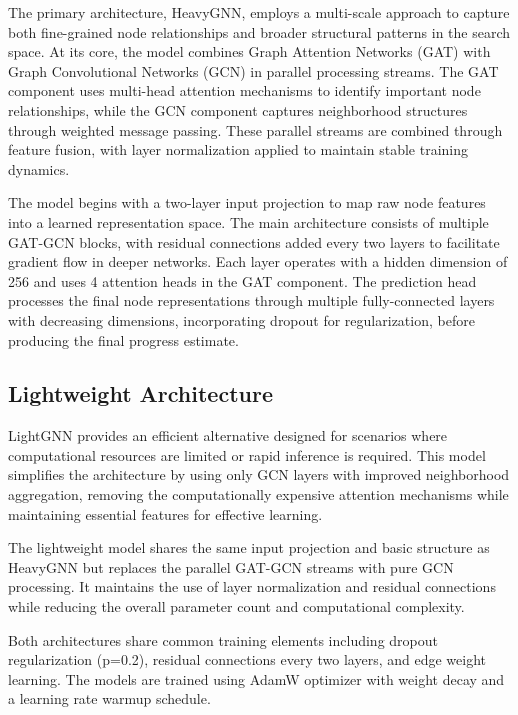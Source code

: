 \documentclass[letterpaper]{article}
\newcommand{\gur}[1]{{\color{teal}{Gur: #1}}}
\begin{document}
\gur{GAT - global structure or only neighbors weighting?}

The primary architecture, HeavyGNN, employs a multi-scale approach to capture both fine-grained node relationships and broader structural patterns in the search space. At its core, the model combines Graph Attention Networks (GAT) with Graph Convolutional Networks (GCN) in parallel processing streams. The GAT component uses multi-head attention mechanisms to identify important node relationships, while the GCN component captures neighborhood structures through weighted message passing. These parallel streams are combined through feature fusion, with layer normalization applied to maintain stable training dynamics.

The model begins with a two-layer input projection to map raw node features into a learned representation space. The main architecture consists of multiple GAT-GCN blocks, with residual connections added every two layers to facilitate gradient flow in deeper networks. Each layer operates with a hidden dimension of 256 and uses 4 attention heads in the GAT component. The prediction head processes the final node representations through multiple fully-connected layers with decreasing dimensions, incorporating dropout for regularization, before producing the final progress estimate.

\subsection{Lightweight Architecture}

LightGNN provides an efficient alternative designed for scenarios where computational resources are limited or rapid inference is required. This model simplifies the architecture by using only GCN layers with improved neighborhood aggregation, removing the computationally expensive attention mechanisms while maintaining essential features for effective learning.

The lightweight model shares the same input projection and basic structure as HeavyGNN but replaces the parallel GAT-GCN streams with pure GCN processing. It maintains the use of layer normalization and residual connections while reducing the overall parameter count and computational complexity.

Both architectures share common training elements including dropout regularization (p=0.2), residual connections every two layers, and edge weight learning. The models are trained using AdamW optimizer with weight decay and a learning rate warmup schedule.
\end{document}
